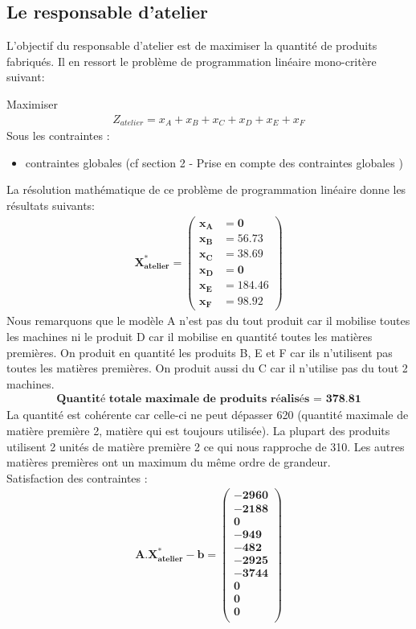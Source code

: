 \documentclass[12pt]{article}
\begin{document}
\subsection{Le responsable d'atelier}
L'objectif du responsable d'atelier est de maximiser la quantité de produits fabriqués. 
Il en ressort le problème de programmation linéaire mono-critère suivant:
\begin{tcolorbox}
Maximiser
\begin{align*}
Z_{atelier}= x_{A} + x_{B} + x_{C} + x_{D} + x_{E} + x_{F}
\end{align*}
Sous les contraintes :
\begin{itemize}
\item contraintes globales (cf section 2 - Prise en compte des contraintes globales )
\end{itemize}
\end{tcolorbox}
La résolution mathématique de ce problème de programmation linéaire donne les résultats suivants:
\begin{align*} 
	\boldsymbol{X^{*}_{atelier} = 
   \left (
   \begin{aligned}
       x_{A} &= 0 \\
      x_{B} &= 56.73 \\
      x_{C} &= 38.69 \\
      x_{D} &= 0 \\
      x_{E} &= 184.46 \\
      x_{F} &= 98.92 
   \end{aligned}
   \right )
 }
\end{align*}
Nous remarquons que le modèle A n'est pas du tout produit car il mobilise toutes les machines ni le produit D car il mobilise en quantité toutes les matières premières. On produit en quantité les produits B, E et F car ils n'utilisent pas toutes les matières premières. On produit aussi du C car il n'utilise pas du tout 2 machines.
\begin{align*}
\textbf{Quantité totale maximale de produits réalisés = 378.81}
\end{align*}
La quantité est cohérente car celle-ci ne peut dépasser 620 (quantité maximale de matière
première 2, matière qui est toujours utilisée). La plupart des produits utilisent 2 unités de 
matière première 2 ce qui nous rapproche de 310. Les autres matières premières ont un maximum du même ordre de grandeur.\\
Satisfaction des contraintes :
\begin{align*} 
	\boldsymbol{A.X^{*}_{atelier} - b = 
   \left (
   \begin{aligned}
      -2960 \\
      -2188 \\
      0 \\
      -949 \\
      -482\\
      -2925 \\
      -3744 \\
      0 \\
      0 \\
      0\\
   \end{aligned}
   \right )}
\end{align*}
\end{document}
